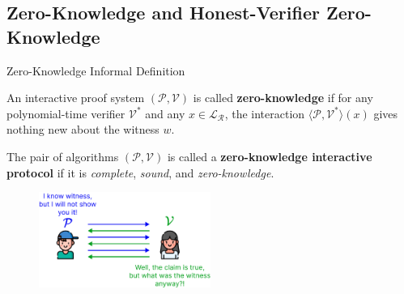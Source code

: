 \documentclass[xcolor={usenames,dvipsnames}]{beamer}
\begin{document}
    \subsection{Zero-Knowledge and Honest-Verifier Zero-Knowledge}
    \begin{frame}{Zero-Knowledge Informal Definition}
        \begin{definition}
            An interactive proof system $(\mathcal{P}, \mathcal{V})$ is called \textbf{zero-knowledge} if for any polynomial-time verifier $\mathcal{V}^*$ and any $x \in \mathcal{L}_{\mathcal{R}}$, the interaction $\langle \mathcal{P}, \mathcal{V}^* \rangle(x)$ gives nothing new about the witness $w$.
        \end{definition}
        
        \begin{definition}
            The pair of algorithms $(\mathcal{P}, \mathcal{V})$ is called a \textbf{zero-knowledge interactive protocol} if it is \textit{complete}, \textit{sound}, and \textit{zero-knowledge}.
        \end{definition}

        \begin{figure}
            \centering
            \includegraphics[width=0.5\textwidth]{images/lecture_6/zk.pdf}
        \end{figure}
    \end{frame}
\end{document}
